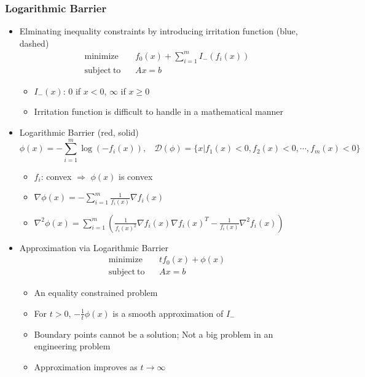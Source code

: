 \subsubsection*{Logarithmic Barrier}
\begin{itemize}
    \item Elminating inequality constraints by introducing irritation function (blue, dashed)
    \begin{equation}\begin{aligned}
        \mathrm{minimize}~~&~~f_0(x)+\sum_{i=1}^mI_-(f_i(x)) \\
        \mathrm{subject~to}~~&~~Ax=b
    \end{aligned}\end{equation}
    \begin{itemize}
        \item $I_-(x)$: $0$ if $x<0$, $\infty$ if $x\geq 0$
        \item Irritation function is difficult to handle in a mathematical manner
    \end{itemize}
    \item Logarithmic Barrier (red, solid)
    \begin{equation}
        \phi(x)=-\sum_{i=1}^m\log(-f_i(x)),~~~~\mathcal{D}(\phi)=\{x|f_1(x)<0,f_2(x)<0,\cdots,f_m(x)<0\}
    \end{equation}
    \begin{itemize}
        \item $f_i$: convex $\Rightarrow$ $\phi(x)$ is convex
        \item $\nabla\phi(x)=-\sum_{i=1}^{m}\frac{1}{f_i(x)}\nabla f_i(x)$
        \item $\nabla^2\phi(x)=\sum_{i=1}^{m}\left(\frac{1}{f_i(x)^2}\nabla f_i(x)\nabla f_i(x)^T-\frac{1}{f_i(x)}\nabla^2f_i(x)\right)$
    \end{itemize}
    \item Approximation via Logarithmic Barrier
    \begin{equation}\begin{aligned}
        \mathrm{minimize}~~&~~tf_0(x)+\phi(x) \\
        \mathrm{subject~to}~~&~~Ax=b
    \end{aligned}\end{equation}
    \begin{itemize}
        \item An equality constrained problem
        \item For $t>0$, $-\frac{1}{t}\phi(x)$ is a smooth approximation of $I_-$
        \item Boundary points cannot be a solution; Not a big problem in an engineering problem
        \item Approximation improves as $t\rightarrow\infty$
    \end{itemize}
    \begin{figures}
    \end{figures}
\end{itemize}

